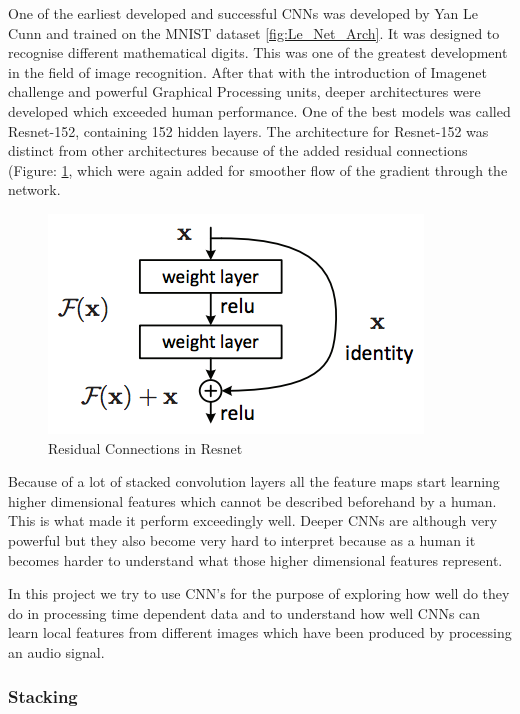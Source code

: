 \documentclass[letterpaper, 10 pt, conference]{ieeeconf}  %
\begin{document}
One of the earliest developed and successful CNNs was developed by Yan Le Cunn \cite{le_net} and trained on the MNIST dataset \ref{fig:Le_Net_Arch}. It was designed to recognise different mathematical digits. This was one of the greatest development in the field of image recognition. After that with the introduction of Imagenet challenge and powerful Graphical Processing units, deeper architectures were developed which exceeded human performance. One of the best models was called Resnet-152, containing 152 hidden layers. The architecture for Resnet-152 was distinct from other architectures because of the added residual connections (Figure: \ref{fig:Resnet_Residual_Arch}, which were again added for smoother flow of the gradient through the network.

\begin{figure}[!h]
\centering
\includegraphics[scale=0.30]{../figs/cnn/resnet_residual.png}	
\caption{Residual Connections in Resnet}
\label{fig:Resnet_Residual_Arch} 
\end{figure}


Because of a lot of stacked convolution layers all the feature maps start learning higher dimensional features which cannot be described beforehand by a human. This is what made it perform exceedingly well. Deeper CNNs are although very powerful but they also become very hard to interpret because as a human it becomes harder to understand what those higher dimensional features represent.

In this project we try to use CNN's for the purpose of exploring how well do they do in processing time dependent data and to understand how well CNNs can learn local features from different images which have been produced by processing an audio signal.

\subsubsection{Stacking}
\end{document}
